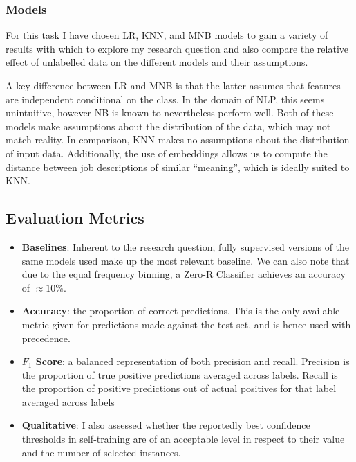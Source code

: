 \documentclass[11pt]{article}
\begin{document}

 
\subsubsection{Models}

For this task I have chosen LR, KNN, and MNB models to gain a variety of 
results with which to explore my research question and also compare the 
relative effect of unlabelled data on the different models and their assumptions.

A key difference between LR and MNB is that the latter assumes that 
features are independent conditional on the class. In the domain of NLP, this 
seems unintuitive, however NB is known to nevertheless perform well. 
Both of these models make assumptions about the distribution of the data, 
which may not match reality. In comparison, KNN makes no assumptions 
about the distribution of input data. Additionally, the use of embeddings 
allows us to compute the distance between job descriptions of similar ``meaning'', which is ideally suited to KNN.

\subsection{Evaluation Metrics}
 
\begin{itemize}
	\item \textbf{Baselines}: Inherent to the research question, fully supervised versions of the same models used make up the most relevant baseline. We can also note that due to the equal frequency binning, a Zero-R Classifier achieves an accuracy of $\approx10\%$.
	\item \textbf{Accuracy}: the proportion of correct predictions. This is the only available metric given for predictions made against the test set, and is hence used with precedence.
	\item \textbf{$F_1$ Score}: a balanced representation of both precision and recall. Precision is the proportion of true positive predictions averaged across labels. Recall is the proportion of positive predictions out of actual positives for that label averaged across labels 
	\item \textbf{Qualitative}: I also assessed whether the reportedly best confidence thresholds in self-training are of an acceptable level in respect to their value and the number of selected instances.
\end{itemize}
\end{document}
